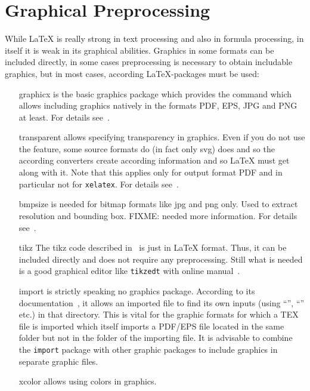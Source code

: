 
\chapter{Graphical Preprocessing}\label{chap:GraphConversions}

While \LaTeX{} is really strong in text processing 
and also in formula processing, 
in itself it is weak in its graphical abilities. 
Graphics in some formats can be included directly, 
in some cases preprocessing is necessary to obtain includable graphics, 
but in most cases, according \LaTeX-packages must be used: 
%
\begin{itemize}
\item[graphicx]
is the basic graphics package which provides the command 
which allows including graphics natively 
in the formats PDF, EPS, JPG and PNG at least. 
For details see~\cite{GraX}. 
\item[transparent]
allows specifying transparency in graphics. 
Even if you do not use the feature, 
some source formats do (in fact only \gls{svg}) does 
and so the according converters create according information 
and so \LaTeX{} must get along with it. 
Note that this applies only for output format PDF 
and in particular not for \texttt{xelatex}. 
For details see~\cite{TransP}. 
\item[bmpsize]
is needed for bitmap formats like \gls{jpg} and \gls{png} only. 
Used to extract resolution and bounding box. 
FIXME\@: needed more information. 
For details see~\cite{BmpP}. 
\item[tikz]
The tikz code described in~\cite{TikzPGF23} is just in \LaTeX{} format. 
Thus, it can be included directly and does not require any preprocessing. 
Still what is needed is a good graphical editor like \texttt{tikzedt} 
with online manual~\cite{TikzEdt}. 
\item[import]
is strictly speaking no graphics package. 
According to its documentation~\cite{ImpoP}, 
it allows an imported file to find its own inputs 
(using ``'', ``'' etc.) in that directory. 
This is vital for the graphic formats for which a TEX file is imported 
which itself imports a PDF/EPS file located in the same folder 
but not in the folder of the importing file. 
It is advisable to combine the \texttt{import} package with other graphic packages 
to include graphics in separate graphic files. 
\item[xcolor]
allows using colors in graphics. 

\end{itemize}
